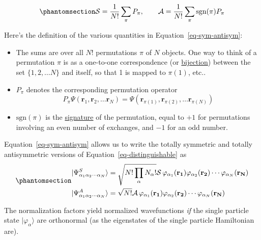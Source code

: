 \documentclass[
  letterpaper,
  DIV=11,
  numbers=noendperiod]{scrreprt}
\providecommand{\tightlist}{%
  \setlength{\itemsep}{0pt}\setlength{\parskip}{0pt}}\usepackage{longtable,booktabs,array}
\begin{document}
\begin{equation}\phantomsection\label{eq-sym-antisym}{
\mathcal{S}=\frac{1}{N!}\sum_{\pi} P_\pi, \qquad \mathcal{A}=\frac{1}{N!}\sum_{\pi} \mathrm{sgn}(\pi)P_\pi
}\end{equation}

Here's the definition of the various quantities in
Equation~\ref{eq-sym-antisym}:

\begin{itemize}
\tightlist
\item
  The sums are over all \(N!\) permutations \(\pi\) of \(N\) objects.
  One way to think of a permutation \(\pi\) is as a one-to-one
  correspondence (or
  \href{https://en.wikipedia.org/wiki/Bijection}{bijection}) between the
  set \(\{1,2,\ldots N\}\) and itself, so that 1 is mapped to
  \(\pi(1)\), etc..
\item
  \(P_\pi\) denotes the corresponding permutation operator \[
  P_\pi \Psi(\mathbf{r}_1,\mathbf{r}_2,\ldots \mathbf{r}_N) = \Psi(\mathbf{r}_{\pi(1)}, \mathbf{r}_{\pi(2)},\ldots \mathbf{r}_{\pi(N)})
  \]
\item
  \(\mathrm{sgn}(\pi)\) is the
  \href{https://en.wikipedia.org/wiki/Parity_of_a_permutation}{signature}
  of the permutation, equal to \(+1\) for permutations involving an even
  number of exchanges, and \(-1\) for an odd number.
\end{itemize}

Equation~\ref{eq-sym-antisym} allows us to write the totally symmetric
and totally antisymmetric versions of Equation~\ref{eq-distinguishable}
as \begin{equation}\phantomsection\label{eq-norm}{
\begin{align}
 \lvert{\Psi^{S}_{\alpha_{1}\alpha_{2}\cdots\alpha_{N}}}\rangle&=\sqrt{N!\prod_{\alpha}N_{\alpha}!}\mathcal{S}\,\varphi_{\alpha_{1}}(\mathbf{r_{1}})\varphi_{\alpha_{2}}(\mathbf{r_{2}})\cdots\varphi_{\alpha_{N}}(\mathbf{r_{N}}) \nonumber \\
 \lvert{\Psi^{A}_{\alpha_{1}\alpha_{2}\cdots\alpha_{N}}}\rangle&=\sqrt{N!}\mathcal{A}\,\varphi_{\alpha_{1}}(\mathbf{r_{1}})\varphi_{\alpha_{2}}(\mathbf{r_{2}})\cdots\varphi_{\alpha_{N}}(\mathbf{r_{N}})
\end{align}
}\end{equation}

The normalization factors yield normalized wavefunctions \emph{if} the
single particle state \(\lvert{\varphi_\alpha}\rangle\) are orthonormal
(as the eigenstates of the single particle Hamiltonian are).
\end{document}

